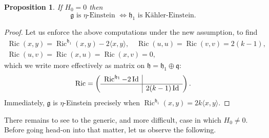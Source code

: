 \documentclass[12pt, twoside]{amsart}
\def\g{\mathfrak{g}}
\def\h{\mathfrak{h}}
\def\q{\mathfrak{q}}
\DeclareMathOperator{\Id}{\operatorname{Id}}
\def\ric{\operatorname{Ric}}
\newtheorem{prop}[definition]{Proposition}
\theoremstyle{definition}
\begin{document}
\begin{prop}\label{H=0}
If $H_0=0$ then 
$$\g \text{ is $\eta$-Einstein } \iff \h_1 \text{ is K{\"a}hler-Einstein}.$$
\end{prop}

\begin{proof}
Let us enforce the above computations under the new assumption, to find
\begin{equation*}\begin{array}{c}
\ric (x,y)=\ric^{\h_1}(x,y)- 2 \langle x, y \rangle, \quad 
\ric (u,u)=\ric (v,v)=2(k-1), \\[2mm]
\ric (u,v)=\ric (x,u)=\ric (x,v)=0,
\end{array}\end{equation*}
which we write more effectively as matrix on $\h=\h_1\oplus{\q}$:
\begin{equation*}
\ric =
\left( \begin{array}{c|c}
     \ric^{\h_1} - 2\Id  & \\ \hline
     & 2(k-1)\Id 
\end{array} \right).
\end{equation*}
Immediately, $\g$ is $\eta$-Einstein precisely when $\ric^{\h_1}(x,y)=2k\langle x,y\rangle$. 
\end{proof}

\bigbreak 

There remains to see to the generic, and more difficult, case in which $H_0 \neq 0$. Before going head-on into that matter, let us observe the following.
\end{document}
